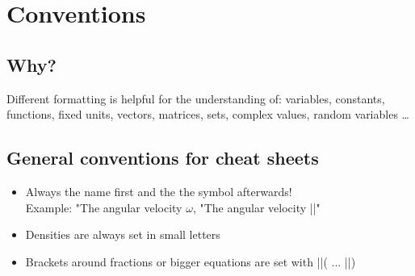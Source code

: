 \documentclass[english]{latex4ei/latex4ei_sheet}
\begin{document}


\section{Conventions}

\begin{sectionbox}
	\subsection*{Why?}

	Different formatting is helpful for the understanding of: variables, constants, functions, fixed units, vectors, matrices, sets, complex values, random variables \ldots
\end{sectionbox}

\begin{sectionbox}
	\subsection{General conventions for cheat sheets}
	\begin{itemize}
		\item Always the name first and the the symbol afterwards! \\ Example: "The angular velocity $\omega$, "The angular velocity \code|\omega|"
		\item Densities are always set in small letters
		\item Brackets around fractions or bigger equations are set with \code|\left|( ... \code|\right|)
	\end{itemize}
\end{sectionbox}
\end{document}
